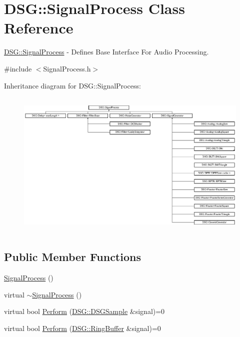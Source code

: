 \hypertarget{class_d_s_g_1_1_signal_process}{\section{D\+S\+G\+:\+:Signal\+Process Class Reference}
\label{class_d_s_g_1_1_signal_process}
}


\hyperlink{class_d_s_g_1_1_signal_process}{D\+S\+G\+::\+Signal\+Process} -\/ Defines Base Interface For Audio Processing.  




{\ttfamily \#include $<$Signal\+Process.\+h$>$}

Inheritance diagram for D\+S\+G\+:\+:Signal\+Process\+:\begin{figure}[H]
\begin{center}
\leavevmode
\includegraphics[height=7.148936cm]{class_d_s_g_1_1_signal_process}
\end{center}
\end{figure}
\subsection*{Public Member Functions}
\begin{DoxyCompactItemize}
\item 
\hyperlink{class_d_s_g_1_1_signal_process_a3fd4347483bcf3cc0a3d7bf98ff56218}{Signal\+Process} ()
\item 
virtual \hyperlink{class_d_s_g_1_1_signal_process_ad9b6a758241a092ddc38e13effc9553f}{$\sim$\+Signal\+Process} ()
\item 
virtual bool \hyperlink{class_d_s_g_1_1_signal_process_af73d246c460915db7a9be7e3ef36844d}{Perform} (\hyperlink{namespace_d_s_g_ac39a94cd27ebcd9c1e7502d0c624894a}{D\+S\+G\+::\+D\+S\+G\+Sample} \&signal)=0
\item 
virtual bool \hyperlink{class_d_s_g_1_1_signal_process_a2c8ff3487d9c43f9eace1d9192d4a37e}{Perform} (\hyperlink{class_d_s_g_1_1_ring_buffer}{D\+S\+G\+::\+Ring\+Buffer} \&signal)=0
\end{DoxyCompactItemize}


